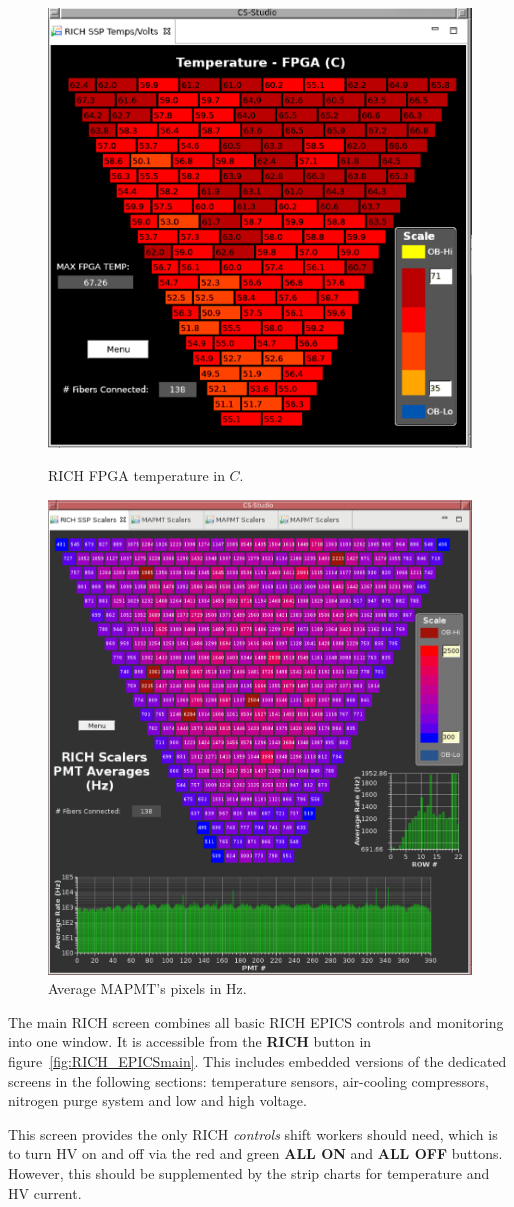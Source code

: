 \documentclass[12pt]{article}
\begin{document}
\begin{figure}[!htb]
   \begin{minipage}{0.98\textwidth}
     \centering
     \includegraphics[width=.5\linewidth]{pics/RICH_temp.png}
     \caption{RICH FPGA temperature in $C$.}
     \label{Fig:temp}
   \end{minipage}\hfill
   \begin{minipage}{0.98\textwidth}
     \centering
     \includegraphics[width=.5\linewidth]{pics/RICH_scalers.png}
     \caption{Average MAPMT's pixels in Hz.}\label{Fig:scaiers}
   \end{minipage}
\end{figure}


 \onecolumn


The main RICH screen combines all basic RICH EPICS controls and monitoring into one window.  It is accessible from the {\bf RICH} 
button in figure~\ref{fig:RICH_EPICSmain}.  This includes embedded versions of the dedicated screens in the following sections:  temperature 
sensors, air-cooling compressors, nitrogen purge system and low and high voltage.  
 
This screen provides the only RICH {\em controls} shift workers should need, which is to turn HV on and off via the red and green 
{\bf ALL ON} and {\bf ALL OFF} buttons.  However, this should be supplemented by the strip charts for temperature and HV current.
\end{document}

